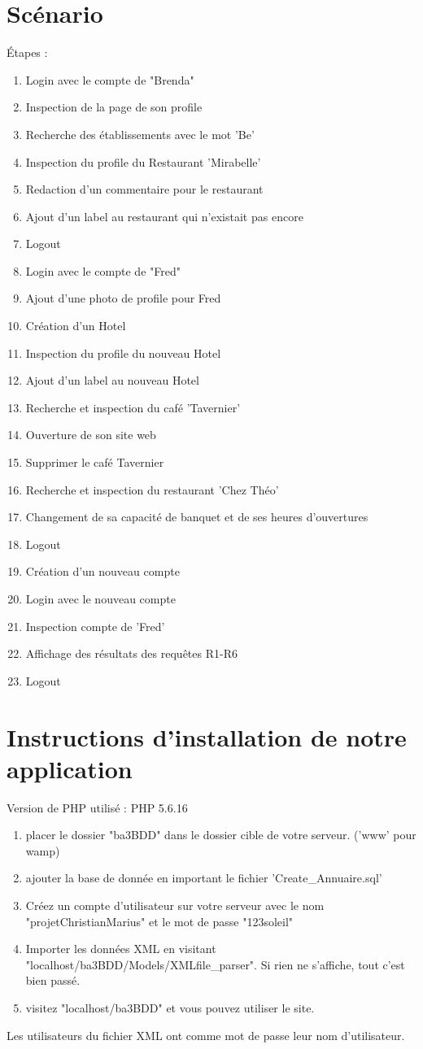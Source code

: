 \documentclass[11pt,a4paper]{report}
\begin{document}
\section*{Scénario}
Étapes :
\begin{enumerate}
\item Login avec le compte de "Brenda"
\item Inspection de la page de son profile
\item Recherche des établissements avec le mot 'Be'
\item Inspection du profile du Restaurant 'Mirabelle'
\item Redaction d'un commentaire pour le restaurant
\item Ajout d'un label au restaurant qui n'existait pas encore
\item Logout
\item Login avec le compte de "Fred"
\item Ajout d'une photo de profile pour Fred
\item Création d'un Hotel
\item Inspection du profile du nouveau Hotel
\item Ajout d'un label au nouveau Hotel
\item Recherche et inspection du café 'Tavernier' 
\item Ouverture de son site web
\item Supprimer le café Tavernier
\item Recherche et inspection du restaurant 'Chez Théo'
\item Changement de sa capacité de banquet et de ses heures d'ouvertures
\item Logout
\item Création d'un nouveau compte
\item Login avec le nouveau compte
\item Inspection compte de 'Fred' 
\item Affichage des résultats des requêtes R1-R6
\item Logout
\end{enumerate}

\section*{Instructions d'installation de notre application}
Version de PHP utilisé : PHP 5.6.16
\begin{enumerate}
\item placer le dossier "ba3BDD" dans le dossier cible de votre serveur. ('www' pour wamp) 
\item ajouter la base de donnée en important le fichier 'Create\_Annuaire.sql' 
\item Créez un compte d'utilisateur sur votre serveur avec le nom "projetChristianMarius" et le mot de passe "123soleil"
\item Importer les données XML en visitant "localhost/ba3BDD/Models/XMLfile\_parser". Si rien ne s'affiche, tout c'est bien passé.
\item visitez "localhost/ba3BDD" et vous pouvez utiliser le site.
\end{enumerate} 
Les utilisateurs du fichier XML ont comme mot de passe leur nom d'utilisateur.
\end{document}
